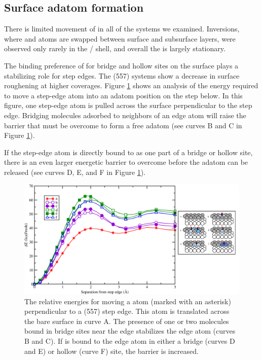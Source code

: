 \subsection{Surface adatom formation}
There is limited movement of  in all of the systems we
examined. Inversions, where  and  atoms are swapped
between surface and subsurface layers, were observed only rarely in
the / shell, and overall the  is largely
stationary.

The binding preference of  for bridge and hollow sites on the
 surface plays a stabilizing role for step edges.  The
(557) systems show a decrease in surface roughening at higher
 coverages. Figure \ref{fig:PdEnergy} shows an analysis of the
energy required to move a step-edge atom into an adatom position on
the step below. In this figure, one step-edge  atom is pulled
across the surface perpendicular to the step edge.  Bridging 
molecules adsorbed to neighbors of an edge atom will raise the barrier
that must be overcome to form a free adatom (see curves B and C in
Figure \ref{fig:PdEnergy}).

If the step-edge atom is directly bound to  as one part of a
bridge or hollow site, there is an even larger energetic barrier to
overcome before the adatom can be released (see curves D, E, and F in
Figure \ref{fig:PdEnergy}).

\begin{landscape}
\begin{figure}[p!]
  \centering
  \includegraphics[width=0.85\linewidth]{../figures/chap3/PdEnergy_CO.pdf}
  \caption{The relative energies for moving a  atom (marked with an
asterisk) perpendicular to a (557) step edge. This atom is translated across
the bare  surface in curve A. The presence of one or two 
molecules bound in bridge sites near the edge stabilizes the edge atom (curves
B and C).  If  is bound to the edge atom in either a bridge (curves D
and E) or hollow (curve F) site, the barrier is increased.}
\label{fig:PdEnergy}
\end{figure}
\end{landscape}

